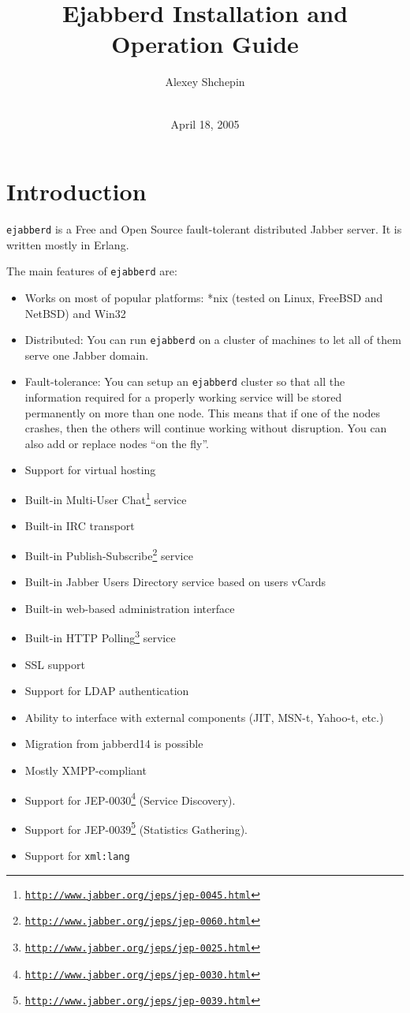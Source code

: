 \documentclass[a4paper,10pt]{article}
\title{Ejabberd Installation and Operation Guide}
\author{Alexey Shchepin \\
  \ahrefurl{mailto:alexey@sevcom.net} \\
  \ahrefurl{xmpp:aleksey@jabber.ru}}
\date{April 18, 2005}
\newcommand{\logoscale}{0.7}
\newcommand{\insscaleimg}[2]{
  \imgsrc{#2}{}
  \begin{latexonly}
    \scalebox{#1}{\texttt{[image: \#2]}}
  \end{latexonly}
}
\newcommand{\ns}[1]{\texttt{#1}}
\newcommand{\ejabberd}{\texttt{ejabberd}}
\newcommand{\Jabber}{Jabber}
\gdef\footahref#1#2{#2\footnote{\href{#1}{\texttt{#1}}}}
\newcommand{\tjepref}[2]{\footahref{http://www.jabber.org/jeps/jep-#1.html}{#2}}
\newcommand{\jepref}[1]{\tjepref{#1}{JEP-#1}}
\begin{document}
\begin{titlepage}
  \maketitle{}
  
  {\centering
    \insscaleimg{\logoscale}{logo.png}
    \par
  }
\end{titlepage}
\tableofcontents{}

\newpage
\section{Introduction}
\label{sec:intro}

\ejabberd{} is a Free and Open Source fault-tolerant distributed \Jabber{}
server.  It is written mostly in Erlang.

The main features of \ejabberd{} are:
\begin{itemize}
\item Works on most of popular platforms: *nix (tested on Linux, FreeBSD and
  NetBSD) and Win32
\item Distributed: You can run \ejabberd{} on a cluster of machines to let all of
  them serve one Jabber domain.
\item Fault-tolerance: You can setup an \ejabberd{} cluster so that all the
  information required for a properly working service will be stored
  permanently on more than one node.  This means that if one of the nodes
  crashes, then the others will continue working without disruption.
  You can also add or replace nodes ``on the fly''.
\item Support for virtual hosting
\item Built-in \tjepref{0045}{Multi-User Chat} service
\item Built-in IRC transport
\item Built-in \tjepref{0060}{Publish-Subscribe} service
\item Built-in Jabber Users Directory service based on users vCards
\item Built-in web-based administration interface
\item Built-in \tjepref{0025}{HTTP Polling} service
\item SSL support
\item Support for LDAP authentication
\item Ability to interface with external components (JIT, MSN-t, Yahoo-t, etc.)
\item Migration from jabberd14 is possible
\item Mostly XMPP-compliant
\item Support for \jepref{0030} (Service Discovery).
\item Support for \jepref{0039} (Statistics Gathering).
\item Support for \ns{xml:lang}
\end{itemize}
\end{document}
